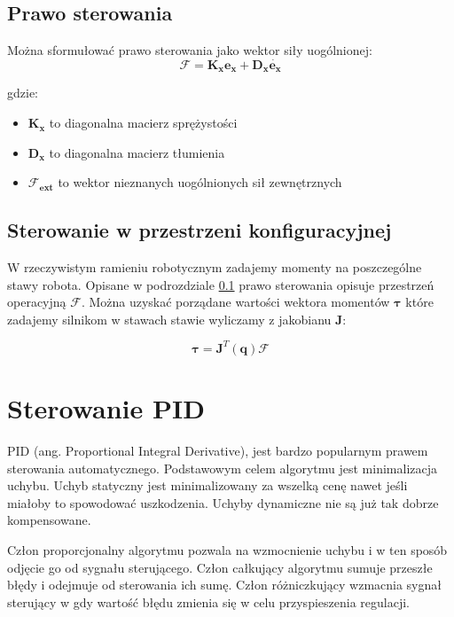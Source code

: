 \subsection{Prawo sterowania}
\label{sec:impedancyjne}

Można sformułować prawo sterowania jako wektor siły uogólnionej:
\begin{equation}
\boldsymbol{\mathcal{F}} = \boldsymbol{K_x}\boldsymbol{e_x} + \boldsymbol{D_x}\dot{\boldsymbol{e_x}}
\end{equation}

gdzie:
\begin{itemize}
\item $\boldsymbol{K_x}$ to diagonalna macierz sprężystości
\item $\boldsymbol{D_x}$ to diagonalna macierz tłumienia
\item $\boldsymbol{\mathcal{F}_{ext}}$ to wektor nieznanych uogólnionych sił zewnętrznych
\end{itemize}

\subsection{Sterowanie w przestrzeni konfiguracyjnej}
W rzeczywistym ramieniu robotycznym zadajemy momenty na poszczególne stawy robota. Opisane w podrozdziale \ref{sec:impedancyjne} prawo sterowania opisuje przestrzeń operacyjną $\boldsymbol{\mathcal{F}}$. Można uzyskać porządane wartości wektora momentów $\boldsymbol{\tau}$ które zadajemy silnikom w stawach stawie wyliczamy z jakobianu $\boldsymbol{J}$:

\begin{equation}
\boldsymbol{\tau} = \boldsymbol{J}^T(\boldsymbol{q})\boldsymbol{\mathcal{F}}
\end{equation}

\section{Sterowanie PID}
PID (ang. Proportional Integral Derivative)\cite{bib:pidTito}, \cite{bib:pidMimo} jest bardzo popularnym prawem sterowania automatycznego. Podstawowym celem algorytmu jest minimalizacja uchybu. Uchyb statyczny jest minimalizowany za wszelką cenę nawet jeśli miałoby to spowodować uszkodzenia. Uchyby dynamiczne nie są już tak dobrze kompensowane.

Człon proporcjonalny algorytmu pozwala na wzmocnienie uchybu i w ten sposób odjęcie go od sygnału sterującego. Człon całkujący algorytmu sumuje przeszłe błędy i odejmuje od sterowania ich sumę. Człon różniczkujący wzmacnia sygnał sterujący w gdy wartość błędu zmienia się w celu przyspieszenia regulacji.
